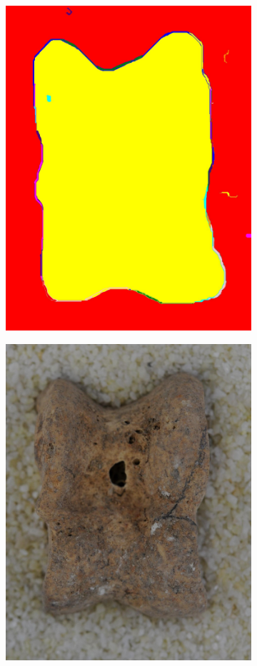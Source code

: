 \documentclass[pdftex,12pt,a4paper]{report}
\begin{document}
\begin{figure}[h]
\begin{subfigure}[b]{0.24\textwidth}
		\includegraphics[width=.9\linewidth]{img/segmentation/good/felzenszwalb/segmented.jpg}
		\subcaption*{}
		\label{}
	\end{subfigure}
	\begin{subfigure}[b]{0.24\textwidth}
		\centering
		\includegraphics[width=.9\linewidth]{img/segmentation/bad/felzenszwalb/cut.jpg}

\end{subfigure}
\end{figure}
\end{document}

